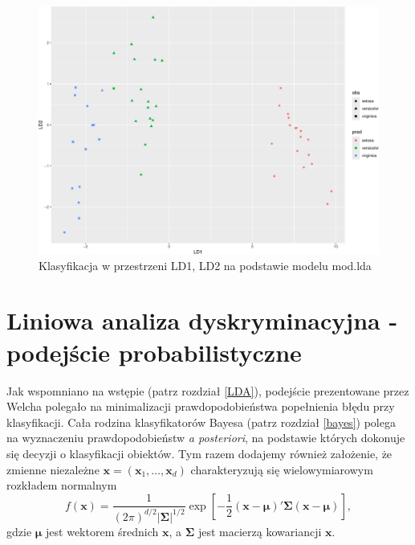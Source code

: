 \documentclass[
]{book}
\theoremstyle{plain}
\theoremstyle{definition}
\theoremstyle{definition}
\theoremstyle{definition}
\theoremstyle{definition}
\theoremstyle{definition}
\theoremstyle{remark}
\begin{document}
\begin{figure}

{\centering \includegraphics{EksploracjaDanych_files/figure-latex/unnamed-chunk-59-1} 

}

\caption{Klasyfikacja w przestrzeni LD1, LD2 na podstawie modelu mod.lda}\label{fig:unnamed-chunk-59}
\end{figure}

\section{Liniowa analiza dyskryminacyjna - podejście probabilistyczne}\label{liniowa-analiza-dyskryminacyjna---podejux15bcie-probabilistyczne}

Jak wspomniano na wstępie (patrz rozdział \ref{LDA}), podejście prezentowane przez Welcha polegało na minimalizacji prawdopodobieństwa popełnienia błędu przy klasyfikacji. Cała rodzina klasyfikatorów Bayesa (patrz rozdział \ref{bayes}) polega na wyznaczeniu prawdopodobieństw \emph{a posteriori}, na podstawie których dokonuje się decyzji o klasyfikacji obiektów. Tym razem dodajemy również założenie, że zmienne niezależne \(\boldsymbol{x}=(\boldsymbol{x}_1,\ldots,\boldsymbol{x}_d)\) charakteryzują się wielowymiarowym rozkładem normalnym
\begin{equation}
    f(\boldsymbol{x}) = \frac{1}{(2\pi)^{d/2}|\boldsymbol{\Sigma}|^{1/2}}\exp\left[-\frac{1}{2}(\boldsymbol{x}-\boldsymbol{\mu})'\boldsymbol{\Sigma}(\boldsymbol{x}-\boldsymbol{\mu})\right],
    \label{eq:mnv}
\end{equation}
gdzie \(\boldsymbol{\mu}\) jest wektorem średnich \(\boldsymbol{x}\), a \(\boldsymbol{\Sigma}\) jest macierzą kowariancji \(\boldsymbol{x}\).
\end{document}
